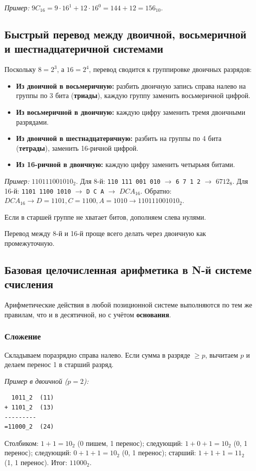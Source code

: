 \textit{Пример:} $9C_{16} = 9\cdot16^1 + 12\cdot16^0 = 144 + 12 = 156_{10}$.

\subsection{Быстрый перевод между двоичной, восьмеричной и шестнадцатеричной системами}
Поскольку $8 = 2^3$, а $16 = 2^4$, перевод сводится к группировке двоичных разрядов:
\begin{itemize}
    \item \textbf{Из двоичной в восьмеричную:} разбить двоичную запись справа налево на группы по 3 бита (\textbf{триады}), каждую группу заменить восьмеричной цифрой.
    \item \textbf{Из восьмеричной в двоичную:} каждую цифру заменить тремя двоичными разрядами.
    \item \textbf{Из двоичной в шестнадцатеричную:} разбить на группы по 4 бита (\textbf{тетрады}), заменить 16-ричной цифрой.
    \item \textbf{Из 16-ричной в двоичную:} каждую цифру заменить четырьмя битами.
\end{itemize}

\textit{Пример:} $110111001010_2$.
Для 8-й: \texttt{110 111 001 010} $\to$ \texttt{6 7 1 2} $\to$ $6712_8$.
Для 16-й: \texttt{1101 1100 1010} $\to$ \texttt{D C A} $\to$ $DCA_{16}$.
Обратно: $DCA_{16} \to D=1101, C=1100, A=1010 \to 110111001010_2$.

Если в старшей группе не хватает битов, дополняем слева нулями.

Перевод между 8-й и 16-й проще всего делать через двоичную как промежуточную.

\subsection{Базовая целочисленная арифметика в N-й системе счисления}
Арифметические действия в любой позиционной системе выполняются по тем же правилам, что и в десятичной, но с учётом \textbf{основания}.

\subsubsection*{Сложение}
Складываем поразрядно справа налево. Если сумма в разряде $\ge p$, вычитаем $p$ и делаем перенос 1 в старший разряд.

\textit{Пример в двоичной ($p=2$):}
\begin{verbatim}
  1011_2  (11)
+ 1101_2  (13)
---------
=11000_2  (24)
\end{verbatim}
Столбиком: $1+1=10_2$ (0 пишем, 1 перенос); следующий: $1+0+1=10_2$ (0, 1 перенос); следующий: $0+1+1=10_2$ (0, 1 перенос); старший: $1+1+1=11_2$ (1, 1 перенос). Итог: $11000_2$.

